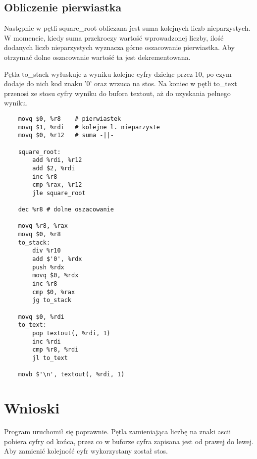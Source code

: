 \documentclass[polish, 11pt]{article}
\begin{document}
	\subsection{Obliczenie pierwiastka}
	
		\begin{minipage}{.4\textwidth}
			Następnie w pętli square\_root obliczana jest suma kolejnych liczb nieparzystych.
			W momencie, kiedy suma przekroczy wartość wprowadzonej liczby,
			ilość dodanych liczb nieparzystych wyznacza górne oszacowanie pierwiastka.
			Aby otrzymać dolne oszacowanie wartość ta jest dekrementowana.

			Pętla to\_stack wyłuskuje z wyniku kolejne cyfry dzieląc przez 10,
			po czym dodaje do nich kod znaku '0' oraz wrzuca na stos. 
			Na koniec w pętli to\_text przenosi ze stosu cyfry wyniku do bufora textout,
			aż do uzyskania pełnego wyniku.

		\end{minipage}%
		\hspace{1cm}
		\begin{minipage}{.5\textwidth}	%
			\begin{lstlisting}	
	movq $0, %r8	# pierwiastek
	movq $1, %rdi   # kolejne l. nieparzyste
	movq $0, %r12   # suma -||-

	square_root:
		add %rdi, %r12
		add $2, %rdi
		inc %r8
		cmp %rax, %r12
		jle square_root

	dec %r8	# dolne oszacowanie

	movq %r8, %rax
	movq $0, %r8
	to_stack:
		div %r10
		add $'0', %rdx
		push %rdx
		movq $0, %rdx
		inc %r8
		cmp $0, %rax
		jg to_stack

	movq $0, %rdi
	to_text:
		pop textout(, %rdi, 1)
		inc %rdi
		cmp %r8, %rdi
		jl to_text

	movb $'\n', textout(, %rdi, 1)
			\end{lstlisting}	%
		\end{minipage}

	\section{Wnioski}
		Program uruchomił się poprawnie.
		Pętla zamieniająca liczbę na znaki ascii pobiera cyfry od końca,
		przez co w buforze cyfra zapisana jest od prawej do lewej.
		Aby zamienić kolejność cyfr wykorzystany został stos.
\end{document}
